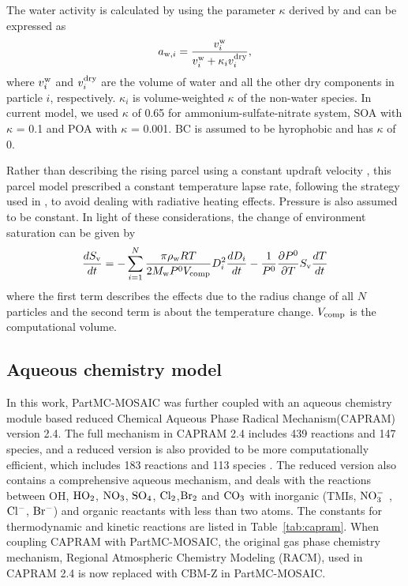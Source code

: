 \documentclass[edeposit,fullpage]{uiucthesis2009}
\begin{document}
The water activity is calculated by using the parameter $\kappa$ derived by \citet{Petters2007} and can be expressed as
\begin{equation}
\centering
a_{{\rm w},i} = \frac{v_i^{\rm w}}{v_i^{\rm w} + \kappa_i v_i^{\rm dry}},
\label{eq:activity coeff}    
\end{equation}
where $v_i^{\rm w}$ and $v_i^{\rm dry}$ are the volume of water and all the other dry components in particle $i$, respectively. $\kappa_i$ is volume-weighted $\kappa$ of the non-water species. In current model, we used $\kappa$ of 0.65 for ammonium-sulfate-nitrate system, SOA with $\kappa$ = 0.1 and POA with $\kappa$ = 0.001. BC is assumed to be hyrophobic and has $\kappa$ of 0. 

Rather than describing the rising parcel using a constant updraft velocity \citep{Seinfeld2016,rothenberg2016metamodeling}, this parcel model prescribed a constant temperature lapse rate, following the strategy used in \citet{majeed2001microphysics}, to avoid dealing with radiative heating effects. Pressure is also assumed to be constant. In light of these considerations, the change of environment saturation can be given by
\begin{equation}
    \centering
    \frac{dS_{\rm v}}{dt} = -\sum_{i=1}^{N}\frac{\pi \rho_{\rm w} RT}{2M_{\rm w}P^0V_{\rm comp}}D_i^2\frac{dD_i}{dt} - \frac{1}{P^0}\frac{\partial P^0}{\partial T}S_{\rm v}\frac{dT}{dt}
\end{equation}
where the first term describes the effects due to the radius change of all $N$ particles and the second term is about the temperature change. $V_{\rm comp}$ is the computational volume. 


\subsection{Aqueous chemistry model}
\label{section:aq-chem-model}
In this work, PartMC-MOSAIC was further coupled with an aqueous chemistry module based reduced Chemical Aqueous Phase Radical Mechanism(CAPRAM) version 2.4. The full mechanism in CAPRAM 2.4 includes 439 reactions and 147 species, and a reduced version is also provided to be more computationally efficient, which includes 183 reactions and 113 species \citep{Ervens2003}. The reduced version also contains a comprehensive aqueous mechanism, and deals with the reactions between OH, $\rm HO_2$, $\rm NO_3$, $\rm SO_4$, $\rm Cl_2$,$\rm Br_2$ and $\rm CO_3$ with inorganic (TMIs, $\rm NO_3^-$ , $\rm Cl^-$, $\rm Br^-$) and organic reactants with less than two atoms. The constants for thermodynamic and kinetic reactions are listed in Table~\ref{tab:capram}. When coupling CAPRAM with PartMC-MOSAIC, the original gas phase chemistry mechanism, Regional Atmospheric Chemistry Modeling (RACM), used in CAPRAM 2.4 is now replaced with CBM-Z in PartMC-MOSAIC. 
\end{document}
